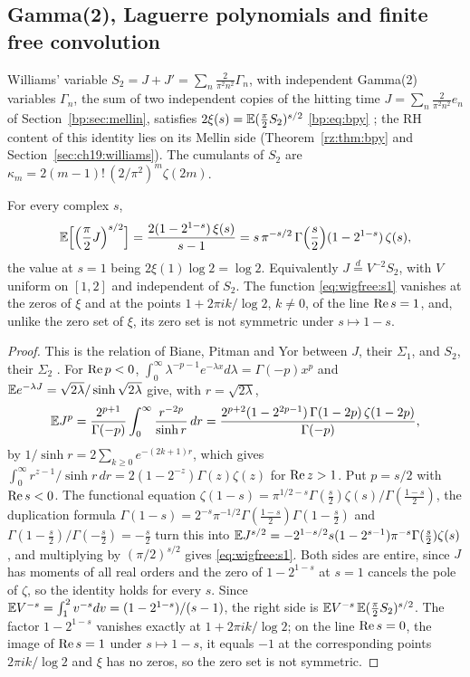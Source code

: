 \subsection{Gamma(2), Laguerre polynomials and finite free convolution}\label{sec:wigfree:gamma2}

Williams' variable \cite{Williams90} $S_2=J+J'=\sum_n\frac2{\pi^2n^2}\Gamma_n$, with independent Gamma(2) variables $\Gamma_n$, the sum of two independent copies of the hitting time $J=\sum_n\frac2{\pi^2n^2}e_n$ of Section~\ref{bp:sec:mellin}, satisfies $2\xi(s)=\mathbb{E}(\frac\pi2S_2)^{s/2}$ \eqref{bp:eq:bpy} \cite{BPY01}; the RH content of this identity lies on its Mellin side (Theorem~\ref{rz:thm:bpy} and Section~\ref{sec:ch19:williams}). The cumulants of $S_2$ are $\kappa_m=2(m-1)!\,(2/\pi^2)^m\zeta(2m)$.

\begin{proposition}\label{prop:wigfree:s1}
For every complex $s$,
\begin{equation}\label{eq:wigfree:s1}
\mathbb{E}\Big[\Big(\frac\pi2J\Big)^{s/2}\Big]=\frac{2(1-2^{1-s})\,\xi(s)}{s-1}=s\,\pi^{-s/2}\,\Gamma\Big(\frac s2\Big)(1-2^{1-s})\,\zeta(s),
\end{equation}
the value at $s=1$ being $2\xi(1)\log2=\log2$. Equivalently $J\stackrel d=V^{-2}S_2$, with $V$ uniform on $[1,2]$ and independent of $S_2$. The function \eqref{eq:wigfree:s1} vanishes at the zeros of $\xi$ and at the points $1+2\pi ik/\log2$, $k\ne0$, of the line $\operatorname{Re} s=1$, and, unlike the zero set of $\xi$, its zero set is not symmetric under $s\mapsto1-s$.
\end{proposition}

\begin{proof}
This is the relation of Biane, Pitman and Yor between $J$, their $\Sigma_1$, and $S_2$, their $\Sigma_2$ \cite[Table 1 and (43) to (45)]{BPY01}. For $\operatorname{Re} p<0$, $\int_0^\infty\lambda^{-p-1}e^{-\lambda x}d\lambda=\Gamma(-p)x^p$ and $\mathbb{E} e^{-\lambda J}=\sqrt{2\lambda}/\sinh\sqrt{2\lambda}$ give, with $r=\sqrt{2\lambda}$,
\[
\mathbb{E} J^p=\frac{2^{p+1}}{\Gamma(-p)}\int_0^\infty\frac{r^{-2p}}{\sinh r}\,dr=\frac{2^{p+2}(1-2^{2p-1})\,\Gamma(1-2p)\,\zeta(1-2p)}{\Gamma(-p)},
\]
by $1/\sinh r=2\sum_{k\ge0}e^{-(2k+1)r}$, which gives $\int_0^\infty r^{z-1}/\sinh r\,dr=2(1-2^{-z})\Gamma(z)\zeta(z)$ for $\operatorname{Re} z>1$. Put $p=s/2$ with $\operatorname{Re} s<0$. The functional equation $\zeta(1-s)=\pi^{1/2-s}\Gamma(\frac s2)\zeta(s)/\Gamma(\frac{1-s}2)$, the duplication formula $\Gamma(1-s)=2^{-s}\pi^{-1/2}\Gamma(\frac{1-s}2)\Gamma(1-\frac s2)$ and $\Gamma(1-\frac s2)/\Gamma(-\frac s2)=-\frac s2$ turn this into $\mathbb{E} J^{s/2}=-2^{1-s/2}s(1-2^{s-1})\pi^{-s}\Gamma(\frac s2)\zeta(s)$, and multiplying by $(\pi/2)^{s/2}$ gives \eqref{eq:wigfree:s1}. Both sides are entire, since $J$ has moments of all real orders and the zero of $1-2^{1-s}$ at $s=1$ cancels the pole of $\zeta$, so the identity holds for every $s$. Since $\mathbb{E} V^{-s}=\int_1^2v^{-s}dv=(1-2^{1-s})/(s-1)$, the right side is $\mathbb{E} V^{-s}\,\mathbb{E}(\frac\pi2S_2)^{s/2}$. The factor $1-2^{1-s}$ vanishes exactly at $1+2\pi ik/\log2$; on the line $\operatorname{Re} s=0$, the image of $\operatorname{Re} s=1$ under $s\mapsto1-s$, it equals $-1$ at the corresponding points $2\pi ik/\log2$ and $\xi$ has no zeros, so the zero set is not symmetric.
\end{proof}

